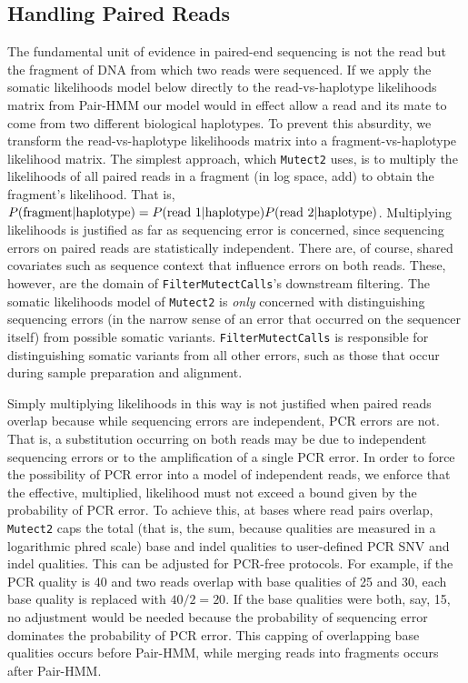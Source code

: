 \documentclass[nofootinbib,amssymb,amsmath]{revtex4}
\newcommand{\code}[1]{\texttt{#1}}
\begin{document}
\subsection{Handling Paired Reads}
The fundamental unit of evidence in paired-end sequencing is not the read but the fragment of DNA from which two reads were sequenced.  If we apply the somatic likelihoods model below directly to the read-vs-haplotype likelihoods matrix from Pair-HMM our model would in effect allow a read and its mate to come from two different biological haplotypes.  To prevent this absurdity, we transform the read-vs-haplotype likelihoods matrix into a fragment-vs-haplotype likelihood matrix.  The simplest approach, which \code{Mutect2} uses, is to multiply the likelihoods of all paired reads in a fragment (in log space, add) to obtain the fragment's likelihood.  That is, $P({\rm fragment} | {\rm haplotype}) = P({\rm read~1} | {\rm haplotype}) P({\rm read~2} | {\rm haplotype})$.  Multiplying likelihoods is justified as far as sequencing error is concerned, since sequencing errors on paired reads are statistically independent.  There are, of course, shared covariates such as sequence context that influence errors on both reads.  These, however, are the domain of \code{FilterMutectCalls}'s downstream filtering.  The somatic likelihoods model of \code{Mutect2} is \textit{only} concerned with distinguishing sequencing errors (in the narrow sense of an error that occurred on the sequencer itself) from possible somatic variants.  \code{FilterMutectCalls} is responsible for distinguishing somatic variants from all other errors, such as those that occur during sample preparation and alignment.

Simply multiplying likelihoods in this way is not justified when paired reads overlap because while sequencing errors are independent, PCR errors are not.  That is, a substitution occurring on both reads may be due to independent sequencing errors or to the amplification of a single PCR error.  In order to force the possibility of PCR error into a model of independent reads, we enforce that the effective, multiplied, likelihood must not exceed a bound given by the probability of PCR error.  To achieve this, at bases where read pairs overlap, \code{Mutect2} caps the total (that is, the sum, because qualities are measured in a logarithmic phred scale) base and indel qualities to user-defined PCR SNV and indel qualities.  This can be adjusted for PCR-free protocols.  For example, if the PCR quality is 40 and two reads overlap with base qualities of 25 and 30, each base quality is replaced with $40/2 = 20$.  If the base qualities were both, say, 15, no adjustment would be needed because the probability of sequencing error dominates the probability of PCR error.  This capping of overlapping base qualities occurs before Pair-HMM, while merging reads into fragments occurs after Pair-HMM.
\end{document}
